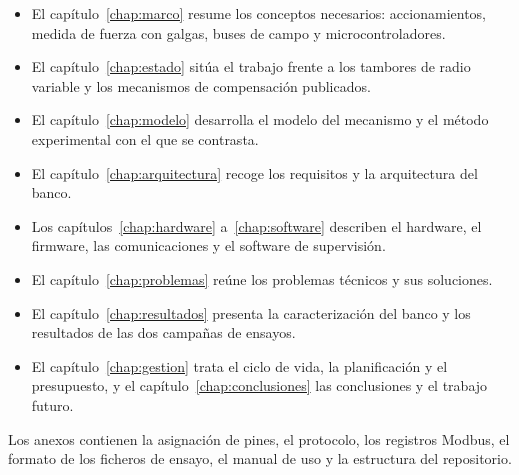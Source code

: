 \begin{itemize}
  \item El capítulo~\ref{chap:marco} resume los conceptos necesarios: accionamientos, medida de
        fuerza con galgas, buses de campo y microcontroladores.
  \item El capítulo~\ref{chap:estado} sitúa el trabajo frente a los tambores de radio variable y los
        mecanismos de compensación publicados.
  \item El capítulo~\ref{chap:modelo} desarrolla el modelo del mecanismo y el método experimental
        con el que se contrasta.
  \item El capítulo~\ref{chap:arquitectura} recoge los requisitos y la arquitectura del banco.
  \item Los capítulos~\ref{chap:hardware} a~\ref{chap:software} describen el hardware, el firmware,
        las comunicaciones y el software de supervisión.
  \item El capítulo~\ref{chap:problemas} reúne los problemas técnicos y sus soluciones.
  \item El capítulo~\ref{chap:resultados} presenta la caracterización del banco y los resultados de
        las dos campañas de ensayos.
  \item El capítulo~\ref{chap:gestion} trata el ciclo de vida, la planificación y el presupuesto, y
        el capítulo~\ref{chap:conclusiones} las conclusiones y el trabajo futuro.
\end{itemize}

Los anexos contienen la asignación de pines, el protocolo, los registros Modbus, el formato de los
ficheros de ensayo, el manual de uso y la estructura del repositorio.
